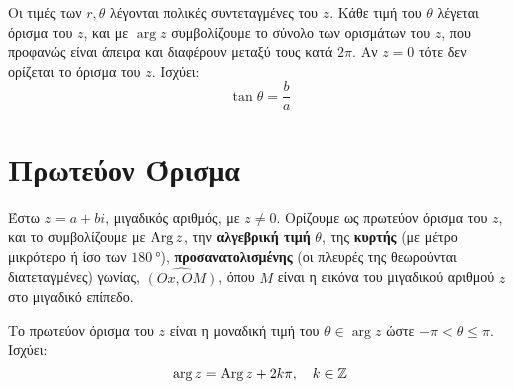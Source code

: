 Οι τιμές των $r, \theta$ λέγονται \textcolor{Col1}{πολικές συντεταγμένες} του $z$. Κάθε
τιμή του $\theta$ λέγεται \textcolor{Col1}{όρισμα} του $z$, και με $\arg z$ συμβολίζουμε
το σύνολο των ορισμάτων του $z$, που προφανώς είναι άπειρα και διαφέρουν μεταξύ τους κατά
$2\pi$. Αν $z=0$ τότε δεν ορίζεται το όρισμα του $z$. Ισχύει:
\[
  \tan\theta=\frac{b}{a}
\]

\section*{Πρωτεύον Όρισμα}


\begin{dfn}
  Έστω $ z=a+bi $, μιγαδικός αριθμός, με $ z \neq 0 $. 
  Ορίζουμε ως \textcolor{Col1}{πρωτεύον όρισμα} του $ z 
  $, και το συμβολίζουμε με $ \operatorname{Arg} z $, την \textbf{αλγεβρική τιμή} $\theta$, 
  της \textbf{κυρτής} (με μέτρο μικρότερο ή ίσο των $ \SI{180}{\degree} $), 
  \textbf{προσανατολισμένης} (οι πλευρές της θεωρούνται διατεταγμένες) γωνίας, 
  $ \widehat{(Ox,OM)} $, όπου $M$ είναι η εικόνα του 
  μιγαδικού αριθμού $z$ στο μιγαδικό επίπεδο.
\end{dfn}
\begin{rem}
  Το πρωτεύον όρισμα του $z$ είναι η μοναδική τιμή του 
  $\theta\in \arg z$ ώστε $ - \pi < \theta \leq \pi$. 
  Ισχύει:
  \[
    \arg z=\operatorname{Arg} z+2k\pi, \quad k\in\mathbb{Z}
  \]
\end{rem}


